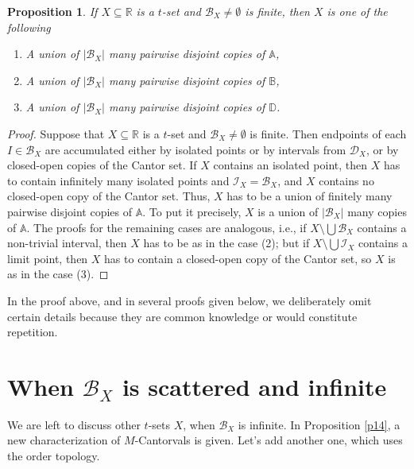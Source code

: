 \documentclass[12pt,a4paper,leqno]{amsart}
\newtheorem{pro}[thm]{Proposition}
\theoremstyle{definition}
\begin{document}
\begin{pro}\label{p19} 
If  $X\subseteq \mathbb R$ is a $ t $-set  and $\mathcal B_X\not=\emptyset$ is finite, then  $X$ is one of the following
\begin{enumerate}
	 	\item A union of $|\mathcal B_X|$ many pairwise disjoint copies of  $\mathbb A$, 
	\item A union of $|\mathcal B_X|$ many pairwise disjoint copies of  $\mathbb B$,
	\item A  union of $|\mathcal B_X|$ many pairwise disjoint copies of $\mathbb D$.
	\end{enumerate}
\end{pro}
\begin{proof} Suppose that $X\subseteq \mathbb R$ is a $ t $-set  and $\mathcal B_X\not=\emptyset$ is finite. Then endpoints of each $I\in \mathcal B_X$ are accumulated  either by isolated points or by intervals from $\mathcal D_X$, or by closed-open copies of the Cantor set.   
 If $X$ contains an isolated point, then $X$ has to contain infinitely many isolated points and $\mathcal I_X= \mathcal B_X$, and $X$ contains no  closed-open copy of the Cantor set. Thus, $X$ has to be  a union of finitely many pairwise disjoint copies of  $\mathbb A$. To put it precisely, $X$  is a union of 
$|\mathcal B_X|$ many copies of $\mathbb A$.  The proofs for the remaining cases are analogous, i.e.,  if $X\setminus \bigcup \mathcal B_X$ contains a non-trivial interval, then $X$ has to be as in the case  (2); but  if  $X\setminus \bigcup \mathcal I_X$ contains a limit point, then $X$ has to contain a closed-open copy of the Cantor set, so $X$ is as in the case  (3).
\end{proof}

In the proof above, and in several proofs given below, we deliberately omit certain details because they are common knowledge or would constitute repetition.

\section{When  $\mathcal B_X$ is scattered and infinite}  
We are left to discuss other  $ t $-sets $X$, when $\mathcal B_X$ is infinite. In Proposition  \ref{p14},
  a new characterization of $M$-Cantorvals  is given. Let's add another one, which uses the order topology.   
  
\end{document}
